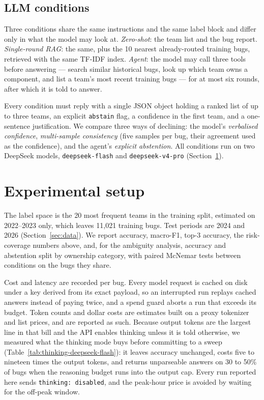 \documentclass[sigconf,anonymous]{acmart}
\begin{document}



\subsection{LLM conditions}
Three conditions share the same instructions and the same label block and differ only in what the
model may look at. \emph{Zero-shot}: the team list and the bug report. \emph{Single-round RAG}:
the same, plus the 10 nearest already-routed training bugs, retrieved with the same TF-IDF index.
\emph{Agent}: the model may call three tools before answering --- search similar historical bugs,
look up which team owns a component, and list a team's most recent training bugs --- for at most
six rounds, after which it is told to answer.

Every condition must reply with a single JSON object holding a ranked list of up to three teams,
an explicit \texttt{abstain} flag, a confidence in the first team, and a one-sentence
justification. We compare three ways of declining: the model's \emph{verbalised confidence},
\emph{multi-sample consistency} (five samples per bug, their agreement used as the confidence),
and the agent's \emph{explicit abstention}. All conditions run on two DeepSeek models,
\texttt{deepseek-flash} and \texttt{deepseek-v4-pro} (Section~\ref{sec:setup}).

\section{Experimental setup}
\label{sec:setup}
The label space is the 20 most frequent teams in the training split, estimated on 2022--2023 only,
which leaves 11{,}021 training bugs. Test periods are 2024 and 2026 (Section~\ref{sec:data}). We
report accuracy, macro-F1, top-3 accuracy, the risk-coverage numbers above, and, for the ambiguity
analysis, accuracy and abstention split by ownership category, with paired McNemar tests between
conditions on the bugs they share.

Cost and latency are recorded per bug. Every model request is cached on disk under a key derived
from its exact payload, so an interrupted run replays cached answers instead of paying twice, and
a spend guard aborts a run that exceeds its budget. Token counts and dollar costs are estimates
built on a proxy tokenizer and list prices, and are reported as such. Because output tokens are the
largest line in that bill and the API enables thinking unless it is told otherwise, we measured
what the thinking mode buys before committing to a sweep
(Table~\ref{tab:thinking-deepseek-flash}): it leaves accuracy unchanged, costs five to nineteen
times the output tokens, and returns unparseable answers on 30 to 50\% of bugs when the reasoning
budget runs into the output cap. Every run reported here sends \texttt{thinking: disabled}, and
the peak-hour price is avoided by waiting for the off-peak window.
\end{document}
